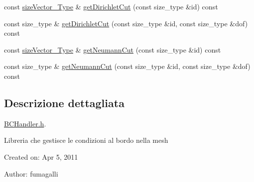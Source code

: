 \begin{DoxyCompactItemize}
\item 
const \hyperlink{Core_8h_a83c51913d041a5001e8683434c09857f}{size\-Vector\-\_\-\-Type} \& \hyperlink{classBCHandler_a1efb6389dbecbcd38e53422ffc6f29c7}{get\-Dirichlet\-Cut} (const size\-\_\-type \&id) const 
\item 
const size\-\_\-type \& \hyperlink{classBCHandler_a390cb50c5fcbbf2e676fe7d5f5241180}{get\-Dirichlet\-Cut} (const size\-\_\-type \&id, const size\-\_\-type \&dof) const 
\item 
const \hyperlink{Core_8h_a83c51913d041a5001e8683434c09857f}{size\-Vector\-\_\-\-Type} \& \hyperlink{classBCHandler_a5e71b2adeaa281e88275bff504dc67d8}{get\-Neumann\-Cut} (const size\-\_\-type \&id) const 
\item 
const size\-\_\-type \& \hyperlink{classBCHandler_a726f1bfbc76113bbb3b5057b25a53871}{get\-Neumann\-Cut} (const size\-\_\-type \&id, const size\-\_\-type \&dof) const 
\end{DoxyCompactItemize}


\subsection{Descrizione dettagliata}
\hyperlink{BCHandler_8h}{B\-C\-Handler.\-h}. 

Libreria che gestisce le condizioni al bordo nella mesh

Created on\-: Apr 5, 2011

Author\-: fumagalli 

